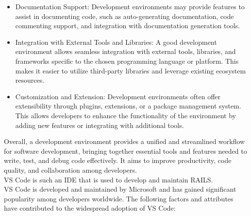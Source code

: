 \begin{itemize}
  \item Documentation Support: Development environments may provide features to assist in documenting code, such as auto-generating documentation, code commenting support, and integration with documentation generation tools.
  \item Integration with External Tools and Libraries: A good development environment allows seamless integration with external tools, libraries, and frameworks specific to the chosen programming language or platform. This makes it easier to utilize third-party libraries and leverage existing ecosystem resources.
  \item Customization and Extension: Development environments often offer extensibility through plugins, extensions, or a package management system. This allows developers to enhance the functionality of the environment by adding new features or integrating with additional tools.
\end{itemize}
Overall, a development environment provides a unified and streamlined workflow for software development, bringing together essential tools and features needed to write, test, and debug code effectively. It aims to improve productivity, code quality, and collaboration among developers.\vspace{5mm} \\
\ac{VS Code} is such an \ac{IDE} that is used to develop and maintain \ac{RAILS}.\vspace{5mm} \\
\ac{VS Code} is developed and maintained by Microsoft and has gained significant popularity among developers worldwide. The following factors and attributes have contributed to the widespread adoption of \ac{VS Code}:

